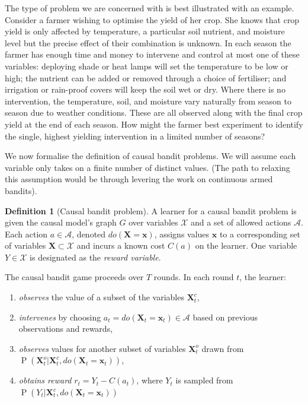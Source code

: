 \documentclass[11pt,a4paper,twoside]{report}
\newcommand{\actionspace}{\mathcal{A}}
\renewcommand{\P}[1]{\operatorname{P}\left(#1\right)}
\renewcommand{\vec}[1]{\boldsymbol{#1}}
\theoremstyle{plain}
\theoremstyle{definition}
\newtheorem{definition}[theorem]{Definition}
\begin{document}
The type of problem we are concerned with is best illustrated with an example. Consider a farmer wishing to optimise the yield of her crop. She knows that crop yield is only affected by temperature, a particular soil nutrient, and moisture level but the precise effect of their combination is unknown. In each season the farmer has enough time and money to intervene and control at most one of these
variables: deploying shade or heat lamps will set the temperature to be low or high; the nutrient can be added or removed through a choice of fertiliser; and irrigation or rain-proof covers will keep the soil wet or dry. Where there is no intervention, the temperature, soil, and moisture vary naturally from season to season due to weather conditions. These are all observed along with the final crop yield at the end of each season. How might the farmer best experiment to identify the single, highest yielding intervention in a limited number of seasons?

We now formalise the definition of causal bandit problems. We will assume each variable only takes on a finite number of distinct values. (The path to relaxing this assumption would be through levering the work on continuous armed bandits). 

\vspace*{.5cm}
\begin{definition}[Causal bandit problem]
A learner for a causal bandit problem is given the causal model’s graph $G$ over variables $\mathcal{X}$ and a set of allowed actions $\actionspace$. Each action $a \in \actionspace$, denoted $do(\vec{X}=\vec{x})$, assigns values $\vec{x}$ to a corresponding set of variables $\vec{X} \subset \mathcal{X}$ and incurs a known cost $C(a)$ on the learner. One variable $Y \in \mathcal{X}$ is designated as the \emph{reward variable}.

The causal bandit game proceeds over $T$ rounds. In each round $t$, the learner:
\begin{enumerate}
\item \emph{observes} the value of a subset of the variables $\vec{X}^c_t$,
\item \emph{intervenes} by choosing $a_t = do(\vec{X}_t = \vec{x}_t) \in \mathcal{A}$ based on previous observations and rewards, 
\item \emph{observes} values for another subset of variables $\vec{X}^o_t$ drawn from $\P{\vec{X}^o_t |\vec{X}^c_t, do(\vec{X}_t = \vec{x}_t)}$,
\item \emph{obtains reward} $r_t = Y_t - C(a_t)$, where $Y_t$ is sampled from $\P{Y_t| \vec{X}^c_t, do(\vec{X}_t = \vec{x}_t)}$
\end{enumerate} 
\end{definition}
\end{document}
